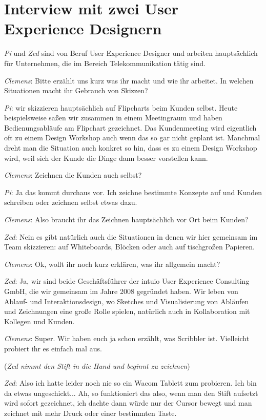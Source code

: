 \clearpage
\section{Interview mit zwei User Experience Designern}
\emph{Pi} und \emph{Zed} sind von Beruf User Experience Designer und arbeiten hauptsächlich für Unternehmen, die im Bereich Telekommunikation tätig sind. 

\medskip \emph{Clemens}: Bitte erzählt uns kurz was ihr macht und wie ihr arbeitet. In welchen Situationen macht ihr Gebrauch von Skizzen?

\medskip \emph{Pi}: wir skizzieren hauptsächlich auf Flipcharts beim Kunden selbst. Heute beispielsweise saßen wir zusammen in einem Meetingraum und haben Bedienungsabläufe am Flipchart gezeichnet. Das Kundenmeeting wird eigentlich oft zu einem Design Workshop auch wenn das so gar nicht geplant ist. Manchmal dreht man die Situation auch konkret so hin, dass es zu einem Design Workshop wird, weil sich der Kunde die Dinge dann besser vorstellen kann.

\medskip \emph{Clemens}: Zeichnen die Kunden auch selbst?

\medskip \emph{Pi}: Ja das kommt durchaus vor. Ich zeichne bestimmte Konzepte auf und Kunden schreiben oder zeichnen selbst etwas dazu.

\medskip \emph{Clemens}: Also braucht ihr das Zeichnen hauptsächlich vor Ort beim Kunden?

\medskip \emph{Zed}: Nein es gibt natürlich auch die Situationen in denen wir hier gemeinsam im Team skizzieren: auf Whiteboards, Blöcken oder auch auf tischgroßen Papieren.

\medskip \emph{Clemens}: Ok, wollt ihr noch kurz erklären, was ihr allgemein macht?

\medskip \emph{Zed}: Ja, wir sind beide Geschäftsführer der intuio User Experience Consulting GmbH, die wir gemeinsam im Jahre 2008 gegründet haben. Wir leben von Ablauf- und Interaktionsdesign, wo Sketches und Visualisierung von Abläufen und Zeichnungen eine große Rolle spielen, natürlich auch in Kollaboration mit Kollegen und Kunden. 

\medskip \emph{Clemens}: Super. Wir haben euch ja schon erzählt, was Scribbler ist. Vielleicht probiert ihr es einfach mal aus.

\medskip (\emph{Zed nimmt den Stift in die Hand und beginnt zu zeichnen})

\medskip \emph{Zed}: Also ich hatte leider noch nie so ein Wacom Tablett zum probieren. Ich bin da etwas ungeschickt... Ah, so funktioniert das also, wenn man den Stift aufsetzt wird sofort gezeichnet, ich dachte dann würde nur der Cursor bewegt und man zeichnet mit mehr Druck oder einer bestimmten Taste. 

